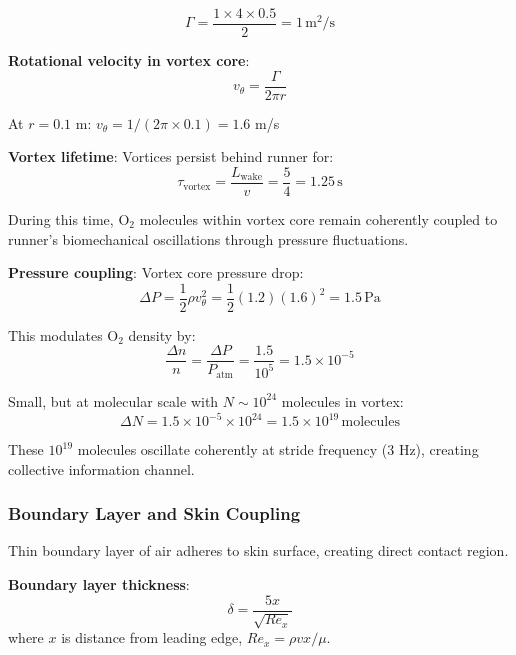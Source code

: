 \documentclass[11pt,onecolumn]{article}
\begin{document}
\begin{equation}
\Gamma = \frac{1 \times 4 \times 0.5}{2} = 1\,\text{m}^2\text{/s}
\end{equation}

\textbf{Rotational velocity in vortex core}:
\begin{equation}
v_{\theta} = \frac{\Gamma}{2\pi r}
\end{equation}

At $r = 0.1$ m: $v_{\theta} = 1/(2\pi \times 0.1) = 1.6$ m/s

\textbf{Vortex lifetime}:
Vortices persist behind runner for:
\begin{equation}
\tau_{\text{vortex}} = \frac{L_{\text{wake}}}{v} = \frac{5}{4} = 1.25\,\text{s}
\end{equation}

During this time, O$_2$ molecules within vortex core remain coherently coupled to runner's biomechanical oscillations through pressure fluctuations.

\textbf{Pressure coupling}:
Vortex core pressure drop:
\begin{equation}
\Delta P = \frac{1}{2}\rho v_{\theta}^2 = \frac{1}{2}(1.2)(1.6)^2 = 1.5\,\text{Pa}
\end{equation}

This modulates O$_2$ density by:
\begin{equation}
\frac{\Delta n}{n} = \frac{\Delta P}{P_{\text{atm}}} = \frac{1.5}{10^5} = 1.5 \times 10^{-5}
\end{equation}

Small, but at molecular scale with $N \sim 10^{24}$ molecules in vortex:
\begin{equation}
\Delta N = 1.5 \times 10^{-5} \times 10^{24} = 1.5 \times 10^{19}\,\text{molecules}
\end{equation}

These $10^{19}$ molecules oscillate coherently at stride frequency (3 Hz), creating collective information channel.

\subsubsection{Boundary Layer and Skin Coupling}

Thin boundary layer of air adheres to skin surface, creating direct contact region.

\textbf{Boundary layer thickness}:
\begin{equation}
\delta = \frac{5x}{\sqrt{Re_x}}
\end{equation}
where $x$ is distance from leading edge, $Re_x = \rho v x / \mu$.
\end{document}
